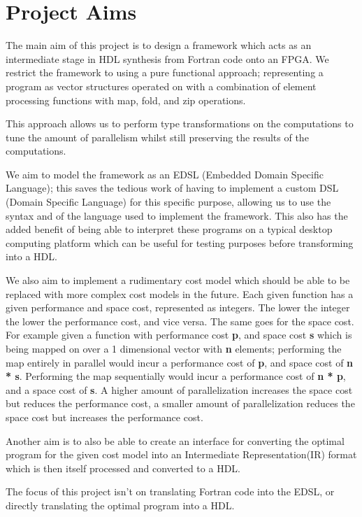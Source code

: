 \section{Project Aims}
The main aim of this project is to design a framework which acts as an intermediate stage in HDL synthesis from Fortran code onto
an FPGA. We restrict the framework to using a pure functional approach; representing a program as vector structures\cite{transformations} operated
on with a combination of element processing functions with map, fold, and zip operations.

This approach allows us to perform type transformations on the computations to tune the amount of parallelism
whilst still preserving the results of the computations. 

We aim to model the framework as an EDSL (Embedded Domain Specific Language); this saves the tedious work
of having to implement a custom DSL (Domain Specific Language) for this specific purpose, allowing us to use the 
syntax and of the language used to implement the framework. This also has the added benefit of being able to interpret 
these programs on a typical desktop computing platform which can be useful for testing purposes before transforming into a 
HDL. 

We also aim to implement a rudimentary cost model which should be able to be replaced with more complex
cost models in the future. Each given function has a given performance and space cost, represented as integers. 
The lower the integer the lower the performance cost, and vice versa. The same goes for the space cost. 
For example given a function with performance cost \textbf{p}, and space cost \textbf{s} which is being mapped on over
a 1 dimensional vector with \textbf{n} elements; performing the map entirely in parallel would incur a performance
cost of \textbf{p}, and space cost of \textbf{n * s}. Performing the map sequentially would incur a performance cost of
\textbf{n * p}, and a space cost of \textbf{s}. A higher amount of parallelization increases the space cost but reduces
the performance cost, a smaller amount of parallelization reduces the space cost but increases the 
performance cost.

Another aim is to also be able to create an interface for converting the optimal program for the given cost model 
into an Intermediate Representation(IR) format which is then itself processed and converted to a HDL.

The focus of this project isn't on translating Fortran code into the EDSL, or directly translating the optimal program 
into a HDL.

